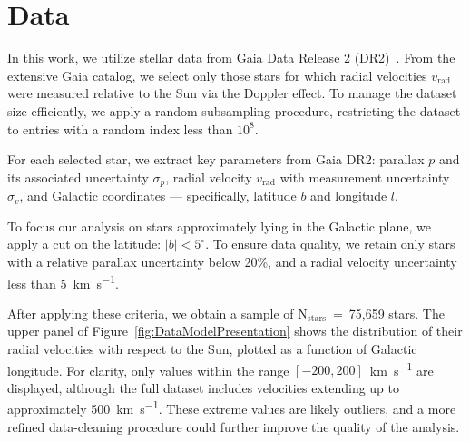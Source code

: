 \section{Data}

In this work, we utilize stellar data from Gaia Data Release 2 (DR2)~\cite{GAIADR2}.  
From the extensive Gaia catalog, we select only those stars 
for which radial velocities $v_{\text{rad}}$ were measured relative to the Sun via the Doppler effect.  
To manage the dataset size efficiently, we apply a random subsampling procedure, 
restricting the dataset to entries with a random index less than $10^8$.

For each selected star, we extract key parameters from Gaia DR2: 
parallax $p$ and its associated uncertainty $\sigma_{p}$, 
radial velocity $v_{\text{rad}}$ with measurement uncertainty $\sigma_{v}$, 
and Galactic coordinates — specifically, latitude $b$ and longitude $l$.

To focus our analysis on stars approximately lying in the Galactic plane, we apply a cut on the latitude: $\vert b \vert < 5^\circ$.  
To ensure data quality, we retain only stars with a relative parallax uncertainty below 20\%, 
and a radial velocity uncertainty less than 5~\unit{\kilo\meter\per\second}.  

After applying these criteria, we obtain a sample of $\text{N}_{\text{stars}}$~=~75,659 stars. 
The upper panel of Figure~\ref{fig:DataModelPresentation} shows the distribution of their radial velocities with respect to the Sun, 
plotted as a function of Galactic longitude. For clarity, only values within the range $[-200, 200]$~\unit{\kilo\meter\per\second} are displayed, 
although the full dataset includes velocities extending up to approximately 500~\unit{\kilo\meter\per\second}. 
These extreme values are likely outliers, and a more refined data-cleaning procedure could further improve the quality of the analysis.

